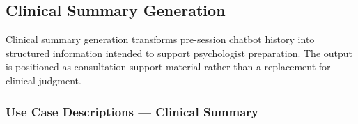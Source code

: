 \documentclass[a4paper,12pt]{report}
\begin{document}
\subsection{Clinical Summary Generation}
Clinical summary generation transforms pre-session chatbot history into structured information intended to support psychologist preparation. The output is positioned as consultation support material rather than a replacement for clinical judgment.

\subsubsection*{Use Case Descriptions --- Clinical Summary}
\end{document}

